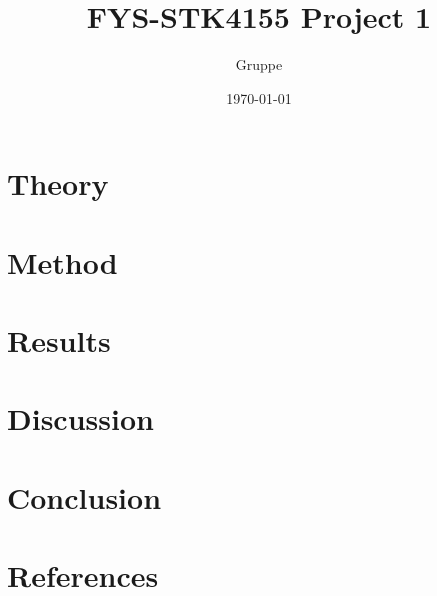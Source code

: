 \documentclass[reprint,english,notitlepage]{revtex4-1}  %
\begin{document}
\title{FYS-STK4155 Project 1}
\author{Gruppe}
\date{\today}
\noaffiliation   


\maketitle


\section{Theory}


\section{Method}


\section{Results}


\section{Discussion}


\section{Conclusion}


\section*{References}



 

\newpage

\clearpage
\onecolumngrid
\appendix
{}


\end{document}
